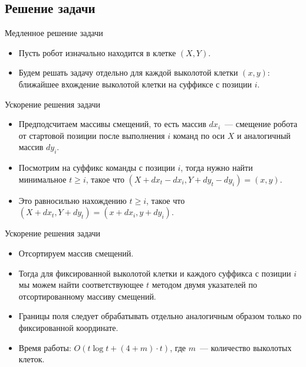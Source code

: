 \subsection{Решение задачи}

\begin{frame}[t]{Медленное решение задачи}
\begin{itemize}
    \item Пусть робот изначально находится в клетке $(X, Y)$.
    \item Будем решать задачу отдельно для каждой выколотой клетки $(x, y)$: ближайшее вхождение выколотой клетки на суффиксе с позиции $i$.
\end{itemize}
\end{frame}

\begin{frame}[t]{Ускорение решения задачи}
\begin{itemize}
    \item Предподсчитаем массивы смещений, то есть
    массив $dx_i$~--- смещение робота от стартовой позиции после выполнения $i$ команд по оси $X$
    и аналогичный массив $dy_i$.
    \item Посмотрим на суффикс команды с позиции $i$, тогда нужно найти минимальное $t \geq i$, такое что $(X + dx_t - dx_i, Y + dy_t - dy_i) = (x, y)$.
    \item Это равносильно нахождению $t \geq i$, такое что $(X + dx_t, Y + dy_t) = (x + dx_i, y + dy_i)$.
\end{itemize}
\end{frame}

\begin{frame}[t]{Ускорение решения задачи}
\begin{itemize}
    \item Отсортируем массив смещений.
    \item Тогда для фиксированной выколотой клетки и каждого суффикса с позиции $i$ мы можем найти соответствующее $t$ методом двумя указателей по отсортированному  массиву смещений.
    \item Границы поля следует обрабатывать отдельно аналогичным образом только по фиксированной координате.
    \item Время работы: $O(t\log t + (4 + m) \cdot t)$, где $m$~--- количество выколотых клеток.
\end{itemize}
\end{frame}

